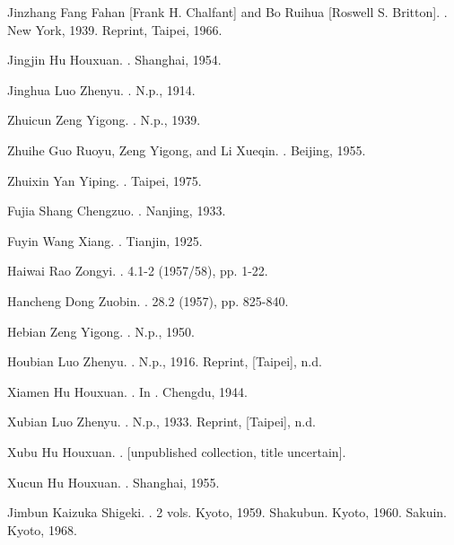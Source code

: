 \begin{list}{}
  \item[Jinzhang] Fang Fahan [Frank H. Chalfant] and Bo Ruihua [Roswell S. Britton]. \allowbreak{}. New York, 1939. Reprint, Taipei, 1966.
  \item[Jingjin] Hu Houxuan. . Shanghai, 1954.
  \item[Jinghua] Luo Zhenyu. . N.p., 1914.
  \item[Zhuicun] Zeng Yigong. . N.p., 1939.
  \item[Zhuihe] Guo Ruoyu, Zeng Yigong, and Li Xueqin. . Beijing, 1955.
  \item[Zhuixin] Yan Yiping. . Taipei, 1975.
  \item[Fujia] Shang Chengzuo. . Nanjing, 1933.
  \item[Fuyin] Wang Xiang. . Tianjin, 1925.
  \item[Haiwai] Rao Zongyi. .  4.1-2 (1957/58), pp. 1-22.
  \item[Hancheng] Dong Zuobin. .  28.2 (1957), pp. 825-840.
  \item[Hebian] Zeng Yigong. . N.p., 1950.
  \item[Houbian] Luo Zhenyu. . N.p., 1916. Reprint, [Taipei], n.d.
  \item[Xiamen] Hu Houxuan. . In . Chengdu, 1944.
  \item[Xubian] Luo Zhenyu. . N.p., 1933. Reprint, [Taipei], n.d.
  \item[Xubu] Hu Houxuan. . [unpublished collection, title uncertain].
  \item[Xucun] Hu Houxuan. . Shanghai, 1955.
  \item[Jimbun] Kaizuka Shigeki. . 2 vols. Kyoto, 1959. Shakubun. Kyoto, 1960. Sakuin. Kyoto, 1968.

\end{list}
